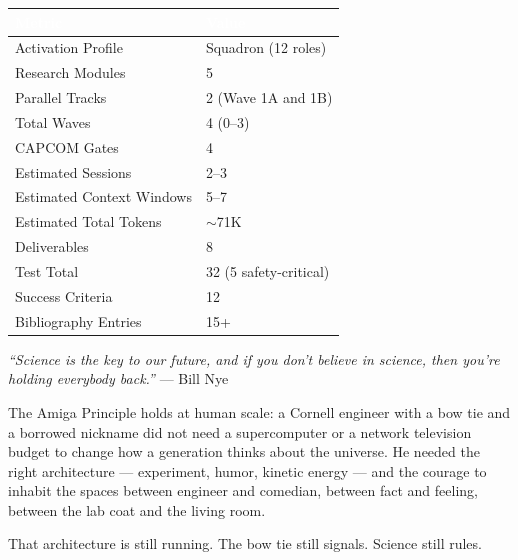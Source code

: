 \documentclass[11pt,letterpaper]{article}
\newcommand{\tableheader}[1]{\textbf{\sffamily\textcolor{white}{#1}}}
\begin{document}
\begin{center}
\begin{tabularx}{\textwidth}{L{4cm}X}
\toprule
{}
\tableheader{Metric} & \tableheader{Value} \\
\midrule
Activation Profile & Squadron (12 roles) \\
Research Modules & 5 \\
Parallel Tracks & 2 (Wave 1A and 1B) \\
Total Waves & 4 (0--3) \\
CAPCOM Gates & 4 \\
Estimated Sessions & 2--3 \\
Estimated Context Windows & 5--7 \\
Estimated Total Tokens & $\sim$71K \\
Deliverables & 8 \\
Test Total & 32 (5 safety-critical) \\
Success Criteria & 12 \\
Bibliography Entries & 15+ \\
\bottomrule
\end{tabularx}
\end{center}

\vspace{2em}

\begin{quotebox}
\textit{``Science is the key to our future, and if you don't believe in science, then you're holding everybody back.''} --- Bill Nye

\vspace{0.8em}
The Amiga Principle holds at human scale: a Cornell engineer with a bow tie and a borrowed nickname did not need a supercomputer or a network television budget to change how a generation thinks about the universe. He needed the right architecture --- experiment, humor, kinetic energy --- and the courage to inhabit the spaces between engineer and comedian, between fact and feeling, between the lab coat and the living room.

That architecture is still running. The bow tie still signals. Science still rules.
\end{quotebox}
\end{document}
